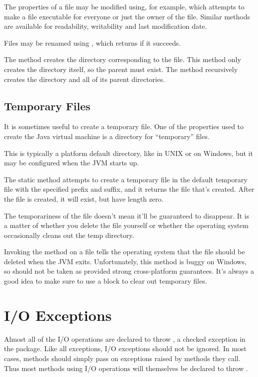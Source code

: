 The properties of a file may be modified using, for example,
 which attempts to make a file executable
for everyone or just the owner of the file.  Similar methods
are available for readability, writability and last modification date.

Files may be renamed using , which returns 
if it succeeds.  

The method  creates the directory corresponding to the file.
This method only creates the directory itself, so the parent must exist.
The method  recursively creates the directory and all of its
parent directories.


\subsection{Temporary Files}

It is sometimes useful to create a temporary file.  One of the
properties used to create the Java virtual machine is a directory for
``temporary'' files.  

This is typically a platform default directory, like
 in UNIX or  on Windows, but it
may be configured when the JVM starts up.

The static  method 
attempts to create a temporary file in the default temporary file with
the specified prefix and suffix, and it returns the file that's
created.  After the file is created, it will exist, but have length
zero.

The temporariness of the file doesn't mean it'll
be guaranteed to disappear.  It is a matter of whether you delete the
file yourself or whether the operating system occasionally cleans out
the temp directory.

Invoking the method  on a file tells the
operating system that the file should be deleted when the JVM exits.
Unfortunately, this method is buggy on Windows, so should not be taken
as provided strong cross-platform guarantees.  It's always a good idea
to make sure to use a  block to clear out temporary
files.  


\section{I/O Exceptions}\label{section:io-ioexception}

Almost all of the I/O operations are declared to throw
, a checked exception in the  package.
Like all exceptions, I/O exceptions should not be ignored.  In most
cases, methods should simply pass on exceptions raised by methods they
call.  Thus most methods using I/O operations will themselves be
declared to throw .  

